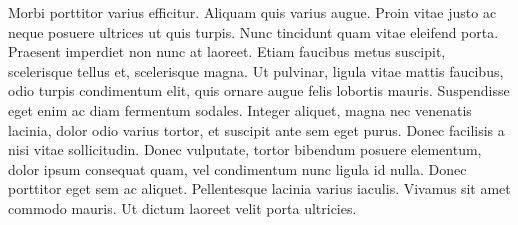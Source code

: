 Morbi porttitor varius efficitur. Aliquam quis varius augue. Proin vitae justo ac neque posuere ultrices ut quis turpis. Nunc tincidunt quam vitae eleifend porta. Praesent imperdiet non nunc at laoreet. Etiam faucibus metus suscipit, scelerisque tellus et, scelerisque magna. Ut pulvinar, ligula vitae mattis faucibus, odio turpis condimentum elit, quis ornare augue felis lobortis mauris. Suspendisse eget enim ac diam fermentum sodales. Integer aliquet, magna nec venenatis lacinia, dolor odio varius tortor, et suscipit ante sem eget purus. Donec facilisis a nisi vitae sollicitudin. Donec vulputate, tortor bibendum posuere elementum, dolor ipsum consequat quam, vel condimentum nunc ligula id nulla. Donec porttitor eget sem ac aliquet. Pellentesque lacinia varius iaculis. Vivamus sit amet commodo mauris. Ut dictum laoreet velit porta ultricies.